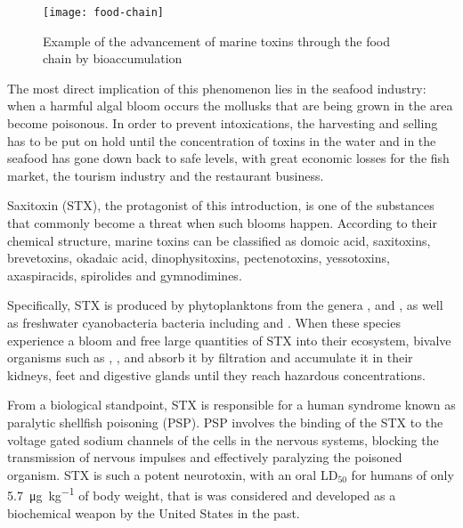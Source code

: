 \begin{figure}
    \centering
    \texttt{[image: food-chain]}
    \caption[Marine toxins through the food chain]{Example of the advancement of marine toxins through the food chain by bioaccumulation}
\end{figure}

The most direct implication of this phenomenon lies in the seafood industry: when a harmful algal bloom occurs the mollusks that are being grown in the area become poisonous.
In order to prevent intoxications, the harvesting and selling has to be put on hold until the concentration of toxins in the water and in the seafood has gone down back to safe levels, with great economic losses for the fish market, the tourism industry and the restaurant business.

Saxitoxin (STX), the protagonist of this introduction, is one of the substances that commonly become a threat when such blooms happen.
According to their chemical structure, marine toxins can be classified as domoic acid, saxitoxins, brevetoxins, okadaic acid, dinophysitoxins, pectenotoxins, yessotoxins, axaspiracids, spirolides and gymnodimines.

Specifically, STX is produced by phytoplanktons from the genera ,  and ,\cite{gerssen10} as well as freshwater cyanobacteria bacteria including  and .\cite{smith11,tebrineh10,}
When these species experience a bloom and free large quantities of STX into their ecosystem, bivalve organisms such as , ,  and  absorb it by filtration and accumulate it in their kidneys, feet and digestive glands\cite{oikawa05} until they reach hazardous concentrations.

From a biological standpoint, STX is responsible for a human syndrome known as paralytic shellfish poisoning (PSP).
PSP involves the binding of the STX to the voltage gated sodium channels of the cells in the nervous systems, blocking the transmission of nervous impulses and effectively paralyzing the poisoned organism.
STX is such a potent neurotoxin, with an oral LD$_{50}$ for humans of only \SI{5.7}{\micro\gram\per\kilo\gram} of body weight,\cite{nguyen20} that is was considered and developed as a biochemical weapon by the United States in the past.\cite{stewart06}

